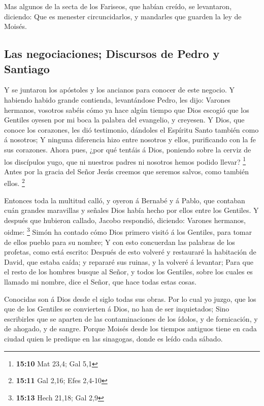  Mas algunos de la secta de los Fariseos, que habían
creído, se levantaron, diciendo: Que es menester circuncidarlos, y
mandarles que guarden la ley de Moisés.

\hypertarget{las-negociaciones-discursos-de-pedro-y-santiago}{%
\subsection{Las negociaciones; Discursos de Pedro y
Santiago}\label{las-negociaciones-discursos-de-pedro-y-santiago}}

 Y se juntaron los apóstoles y los ancianos para conocer
de este negocio.  Y habiendo habido grande contienda,
levantándose Pedro, les dijo: Varones hermanos, vosotros sabéis cómo ya
hace algún tiempo que Dios escogió que los Gentiles oyesen por mi boca
la palabra del evangelio, y creyesen.  Y Dios, que conoce
los corazones, les dió testimonio, dándoles el Espíritu Santo también
como á nosotros;  Y ninguna diferencia hizo entre nosotros
y ellos, purificando con la fe sus corazones.  Ahora
pues, ¿por qué tentáis á Dios, poniendo sobre la cerviz de los
discípulos yugo, que ni nuestros padres ni nosotros hemos podido llevar?
\footnote{\textbf{15:10} Mat 23,4; Gal 5,1}  Antes por la
gracia del Señor Jesús creemos que seremos salvos, como también ellos.
\footnote{\textbf{15:11} Gal 2,16; Efes 2,4-10}

 Entonces toda la multitud calló, y oyeron á Bernabé y á
Pablo, que contaban cuán grandes maravillas y señales Dios había hecho
por ellos entre los Gentiles.  Y después que hubieron
callado, Jacobo respondió, diciendo: Varones hermanos, oidme:
\footnote{\textbf{15:13} Hech 21,18; Gal 2,9}  Simón ha
contado cómo Dios primero visitó á los Gentiles, para tomar de ellos
pueblo para su nombre;  Y con esto concuerdan las
palabras de los profetas, como está escrito:  Después de
esto volveré y restauraré la habitación de David, que estaba caída; y
repararé sus ruinas, y la volveré á levantar;  Para que
el resto de los hombres busque al Señor, y todos los Gentiles, sobre los
cuales es llamado mi nombre, dice el Señor, que hace todas estas cosas.

 Conocidas son á Dios desde el siglo todas sus obras.
 Por lo cual yo juzgo, que los que de los Gentiles se
convierten á Dios, no han de ser inquietados;  Sino
escribirles que se aparten de las contaminaciones de los ídolos, y de
fornicación, y de ahogado, y de sangre.  Porque Moisés
desde los tiempos antiguos tiene en cada ciudad quien le predique en las
sinagogas, donde es leído cada sábado.

